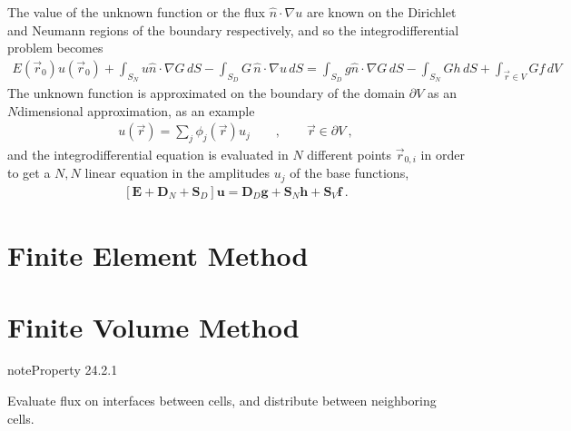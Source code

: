 \documentclass[letterpaper,10pt,english]{jupyterBook}
\begin{document}
\sphinxAtStartPar
The value of the unknown function or the flux \(\hat{n} \cdot \nabla u\) are known on the Dirichlet and Neumann regions of the boundary respectively, and so the integro\sphinxhyphen{}differential problem becomes
\begin{equation*}
\begin{split}E(\vec{r}_0) u(\vec{r}_0) + \int_{S_N} u \hat{n} \cdot \nabla G \, dS - \int_{S_D} G \, \hat{n} \cdot \nabla u \, dS = \int_{S_D} g \hat{n} \cdot \nabla G \, dS - \int_{S_N} G h \, dS + \int_{\vec{r} \in V} G f \, dV\end{split}
\end{equation*}
\sphinxAtStartPar
The unknown function is approximated on the boundary of the domain \(\partial V\) as an \(N\)\sphinxhyphen{}dimensional approximation, as an example
\begin{equation*}
\begin{split}u(\vec{r}) = \sum_{j} \phi_j(\vec{r}) u_j \qquad , \qquad \vec{r} \in \partial V \ ,\end{split}
\end{equation*}
\sphinxAtStartPar
and the integro\sphinxhyphen{}differential equation is evaluated in \(N\) different points \(\vec{r}_{0,i}\) in order to get a \(N,N\) linear equation in the amplitudes \(u_j\) of the base functions,
\begin{equation*}
\begin{split}\left[\mathbf{E} + \mathbf{D}_N + \mathbf{S}_D \right] \mathbf{u} = \mathbf{D}_D \mathbf{g} + \mathbf{S}_N \mathbf{h} + \mathbf{S}_V \mathbf{f} \ .\end{split}
\end{equation*}
\sphinxstepscope


\section{Finite Element Method}
\label{\detokenize{ch/pde/fem:finite-element-method}}\label{\detokenize{ch/pde/fem:pde-fem}}\label{\detokenize{ch/pde/fem::doc}}
\sphinxstepscope


\section{Finite Volume Method}
\label{\detokenize{ch/pde/fvm:finite-volume-method}}\label{\detokenize{ch/pde/fvm:pde-fvm}}\label{\detokenize{ch/pde/fvm::doc}}\label{ch/pde/fvm:fvm:property:conservation}
\begin{sphinxadmonition}{note}{Property 24.2.1}



\sphinxAtStartPar
Evaluate flux on interfaces between cells, and distribute between neighboring cells.
\end{sphinxadmonition}
\end{document}
